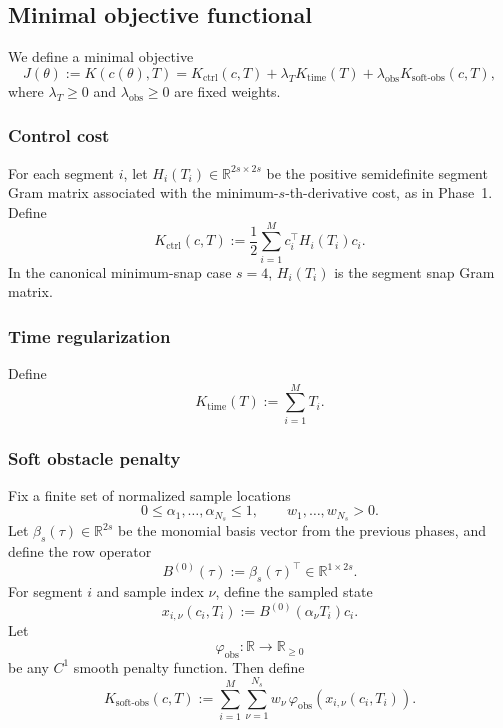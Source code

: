 \subsection{Minimal objective functional}
\label{subsec:phase9_objective}

We define a minimal objective
\begin{equation}
\label{eq:phase9_total_objective}
J(\theta):=
K(c(\theta),T)
=
K_{\mathrm{ctrl}}(c,T)
+
\lambda_T K_{\mathrm{time}}(T)
+
\lambda_{\mathrm{obs}} K_{\mathrm{soft\mbox{-}obs}}(c,T),
\end{equation}
where \(\lambda_T\ge 0\) and \(\lambda_{\mathrm{obs}}\ge 0\) are fixed weights.

\subsubsection{Control cost}
\label{subsubsec:phase9_control_cost}

For each segment \(i\), let \(H_i(T_i)\in\mathbb R^{2s\times 2s}\) be the positive semidefinite segment Gram matrix associated with the minimum-\(s\)-th-derivative cost, as in Phase~1.
Define
\begin{equation}
\label{eq:phase9_Kctrl}
K_{\mathrm{ctrl}}(c,T)
:=
\frac12\sum_{i=1}^{M} c_i^\top H_i(T_i)c_i.
\end{equation}
In the canonical minimum-snap case \(s=4\), \(H_i(T_i)\) is the segment snap Gram matrix.

\subsubsection{Time regularization}
\label{subsubsec:phase9_time_cost}

Define
\begin{equation}
\label{eq:phase9_Ktime}
K_{\mathrm{time}}(T):=\sum_{i=1}^{M}T_i.
\end{equation}

\subsubsection{Soft obstacle penalty}
\label{subsubsec:phase9_soft_obs}

Fix a finite set of normalized sample locations
\[
0\le \alpha_1,\dots,\alpha_{N_s}\le 1,
\qquad
w_1,\dots,w_{N_s}>0.
\]
Let \(\beta_s(\tau)\in\mathbb R^{2s}\) be the monomial basis vector from the previous phases, and define the row operator
\[
B^{(0)}(\tau):=\beta_s(\tau)^\top\in \mathbb R^{1\times 2s}.
\]
For segment \(i\) and sample index \(\nu\), define the sampled state
\begin{equation}
\label{eq:phase9_xinu}
x_{i,\nu}(c_i,T_i)
:=
B^{(0)}(\alpha_\nu T_i)c_i.
\end{equation}
Let
\[
\varphi_{\mathrm{obs}}:\mathbb R\to\mathbb R_{\ge 0}
\]
be any \(C^1\) smooth penalty function.
Then define
\begin{equation}
\label{eq:phase9_Kobs}
K_{\mathrm{soft\mbox{-}obs}}(c,T)
:=
\sum_{i=1}^{M}\sum_{\nu=1}^{N_s}
w_\nu \,\varphi_{\mathrm{obs}}(x_{i,\nu}(c_i,T_i)).
\end{equation}

